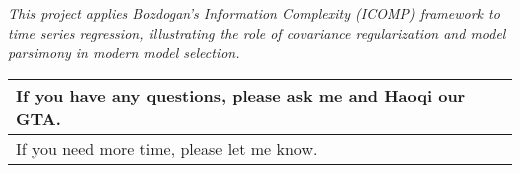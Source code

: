 \documentclass[12pt,thmsa]{article}
\begin{document}
\vspace{1pt}

\begin{center}
\textit{This project applies Bozdogan's Information Complexity (ICOMP)
framework to time series regression, illustrating the role of covariance
regularization and model parsimony in modern model selection.}
\end{center}

\vspace{1pt}

\begin{center}
\begin{tabular}{|l|}
\hline
If you have any questions, please ask me and Haoqi our GTA. \\ \hline
If you need more time, please let me know. \\ \hline
\end{tabular}
\end{center}
\end{document}
